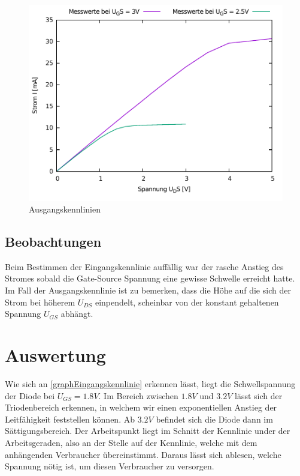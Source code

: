 \documentclass[11pt, a4paper]{article}
\begin{document}
\begin{figure}
    \centering
    \includegraphics[width=\linewidth]{ausgang.pdf}
    \caption{Ausgangskennlinien}
    \label{graphAusgangskennlinie}
\end{figure}
\subsection*{Beobachtungen}
Beim Bestimmen der Eingangskennlinie auffällig war der rasche Anstieg des Stromes sobald die Gate-Source Spannung eine gewisse Schwelle erreicht hatte.
Im Fall der Ausgangskennlinie ist zu bemerken, dass die Höhe auf die sich der Strom bei höherem $U_{DS}$ einpendelt, scheinbar von der konstant gehaltenen Spannung $U_{GS}$ abhängt.
\section*{Auswertung}
Wie sich an \autoref{graphEingangskennlinie} erkennen lässt, liegt die Schwellspannung der Diode bei $U_{GS} = 1.8V$. Im Bereich zwischen $1.8V$ und $3.2V$ lässt sich der Triodenbereich erkennen, in welchem wir einen exponentiellen Anstieg der Leitfähigkeit feststellen können. Ab $3.2V$ befindet sich die Diode dann im Sättigungsbereich. Der Arbeitspunkt liegt im Schnitt der Kennlinie under der Arbeitsgeraden, also an der Stelle auf der Kennlinie, welche mit dem anhängenden Verbraucher übereinstimmt. Daraus lässt sich ablesen, welche Spannung nötig ist, um diesen Verbraucher zu versorgen.
\end{document}
